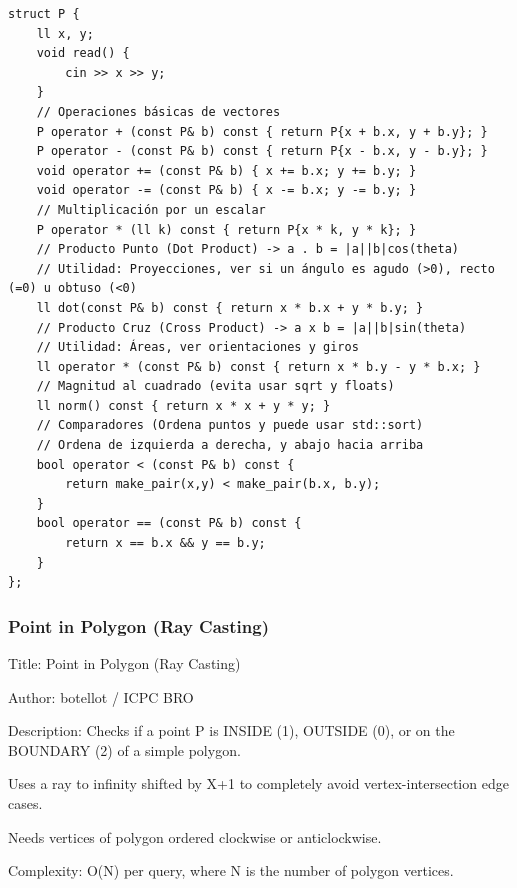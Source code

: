 \documentclass[10pt,landscape,twocolumn]{article}
\begin{document}
\begin{lstlisting}
struct P {
    ll x, y;
    void read() {
        cin >> x >> y;
    }
    // Operaciones básicas de vectores
    P operator + (const P& b) const { return P{x + b.x, y + b.y}; }
    P operator - (const P& b) const { return P{x - b.x, y - b.y}; }
    void operator += (const P& b) { x += b.x; y += b.y; }
    void operator -= (const P& b) { x -= b.x; y -= b.y; }
    // Multiplicación por un escalar
    P operator * (ll k) const { return P{x * k, y * k}; }
    // Producto Punto (Dot Product) -> a . b = |a||b|cos(theta)
    // Utilidad: Proyecciones, ver si un ángulo es agudo (>0), recto (=0) u obtuso (<0)
    ll dot(const P& b) const { return x * b.x + y * b.y; }
    // Producto Cruz (Cross Product) -> a x b = |a||b|sin(theta)
    // Utilidad: Áreas, ver orientaciones y giros
    ll operator * (const P& b) const { return x * b.y - y * b.x; }
    // Magnitud al cuadrado (evita usar sqrt y floats)
    ll norm() const { return x * x + y * y; }
    // Comparadores (Ordena puntos y puede usar std::sort)
    // Ordena de izquierda a derecha, y abajo hacia arriba
    bool operator < (const P& b) const {
        return make_pair(x,y) < make_pair(b.x, b.y);
    }
    bool operator == (const P& b) const {
        return x == b.x && y == b.y;
    }
};
\end{lstlisting}

\subsubsection{Point in Polygon (Ray Casting)}
\begin{flushleft}
\footnotesize\ttfamily
\par\noindent Title: Point in Polygon (Ray Casting)
\par\noindent Author: botellot / ICPC BRO
\par\noindent Description: Checks if a point P is INSIDE (1), OUTSIDE (0), or on the BOUNDARY (2) of a simple polygon.
\par\noindent Uses a ray to infinity shifted by X+1 to completely avoid vertex-intersection edge cases.
\par\noindent Needs vertices of polygon ordered clockwise or anticlockwise.
\par\noindent Complexity: O(N) per query, where N is the number of polygon vertices.
\end{flushleft}
\end{document}
